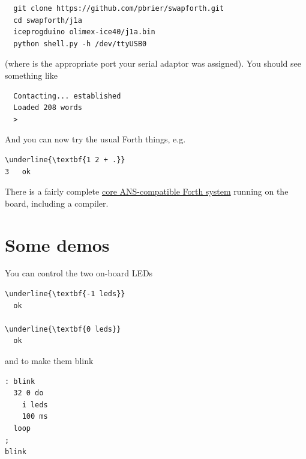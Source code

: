 \begin{framed}
\begin{Verbatim}
  git clone https://github.com/pbrier/swapforth.git
  cd swapforth/j1a
  iceprogduino olimex-ice40/j1a.bin
  python shell.py -h /dev/ttyUSB0
\end{Verbatim}
\end{framed}

\noindent
(where  is the appropriate port your serial adaptor was assigned).
You should see something like

\begin{framed}
\begin{Verbatim}
  Contacting... established
  Loaded 208 words
  >
\end{Verbatim}
\end{framed}

And you can now try the usual Forth things, e.g.

\begin{framed}
\begin{Verbatim}[commandchars=\\\{\}]
\underline{\textbf{1 2 + .}}
3   ok
\end{Verbatim}
\end{framed}

There is a fairly complete 
\href{http://forth.sourceforge.net/std/dpans/dpans6.htm}{core ANS-compatible Forth system}
running on the board, including a compiler.

\newpage
\section{Some demos} 

You can control the two on-board LEDs 

\begin{framed}
\begin{Verbatim}[commandchars=\\\{\}]
\underline{\textbf{-1 leds}}
  ok

\underline{\textbf{0 leds}}
  ok
\end{Verbatim}
\end{framed}

\noindent
and to make them blink

\begin{framed}
\begin{Verbatim}[commandchars=\\\{\}]
: blink
  32 0 do
    i leds
    100 ms
  loop
;
blink
\end{Verbatim}
\end{framed}

